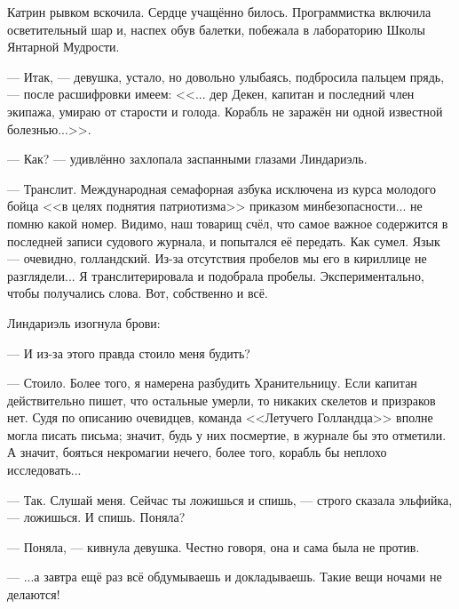 Катрин рывком вскочила. Сердце учащённо билось. Программистка включила осветительный шар и, наспех обув балетки,
побежала в лабораторию Школы Янтарной Мудрости.

\emptypar

--- Итак, --- девушка, устало, но довольно улыбаясь, подбросила пальцем прядь, --- после расшифровки имеем:
<<... дер Декен, капитан и последний член экипажа, умираю от старости и голода.
Корабль не заражён ни одной известной болезнью...>>.

--- Как? --- удивлённо захлопала заспанными глазами Линдариэль.

--- Транслит. Международная семафорная азбука исключена из курса молодого бойца <<в целях поднятия патриотизма>>
приказом минбезопасности... не помню какой номер. Видимо, наш товарищ счёл,
что самое важное содержится в последней записи судового журнала, и попытался её передать.
Как сумел. Язык --- очевидно, голландский. Из-за отсутствия пробелов мы его в кириллице не разглядели...
Я транслитерировала и подобрала пробелы. Экспериментально, чтобы получались слова. Вот, собственно и всё.

Линдариэль изогнула брови:

--- И из-за этого правда стоило меня будить?

--- Стоило. Более того, я намерена разбудить Хранительницу. Если капитан действительно пишет, что остальные умерли,
то никаких скелетов и призраков нет. Судя по описанию очевидцев, команда <<Летучего Голландца>> вполне могла писать письма;
значит, будь у них посмертие, в журнале бы это отметили.
А значит, бояться некромагии нечего, более того, корабль бы неплохо исследовать...

--- Так. Слушай меня. Сейчас ты ложишься и спишь, --- строго сказала эльфийка, --- ложишься. И спишь. Поняла?

--- Поняла, --- кивнула девушка. Честно говоря, она и сама была не против.

--- ...а завтра ещё раз всё обдумываешь и докладываешь. Такие вещи ночами не делаются!


